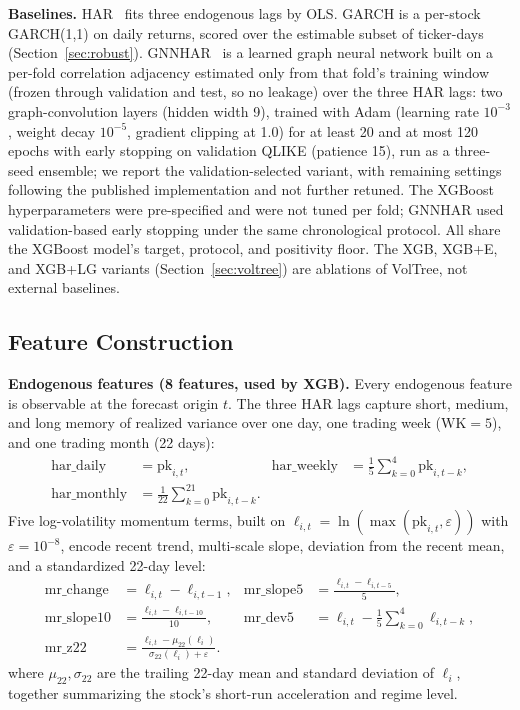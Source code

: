 \documentclass[runningheads,a4paper]{llncs}
\begin{document}
\textbf{Baselines.} HAR~\cite{corsi2009} fits three endogenous lags by OLS. GARCH is a per-stock
GARCH(1,1) on daily returns, scored over the estimable subset of ticker-days (Section~\ref{sec:robust}).
GNNHAR~\cite{gnnhar2024} is a learned graph neural network built on a per-fold correlation adjacency
estimated only from that fold's training window (frozen through validation and test, so no leakage) over the
three HAR lags: two graph-convolution layers (hidden width 9), trained with Adam (learning rate $10^{-3}$,
weight decay $10^{-5}$, gradient clipping at 1.0) for at least 20 and at most 120 epochs with early stopping
on validation QLIKE (patience 15), run as a three-seed ensemble; we report the validation-selected variant,
with remaining settings following the published implementation and not further retuned. The XGBoost
hyperparameters were pre-specified and were not tuned per fold; GNNHAR used validation-based early stopping
under the same chronological protocol. All
share the XGBoost model's target, protocol, and positivity floor. The XGB, XGB+E, and XGB+LG variants (Section~\ref{sec:voltree}) are ablations of VolTree, not
external baselines.

\subsection{Feature Construction}
\textbf{Endogenous features (8 features, used by XGB).} Every endogenous feature is observable at the
forecast origin $t$. The three HAR lags capture short, medium, and long memory of realized variance
over one day, one trading week ($\mathrm{WK}=5$), and one trading month (22 days):
\begin{align}
\mathrm{har\_daily} &= \mathrm{pk}_{i,t}, &
\mathrm{har\_weekly} &= \frac{1}{5}\sum_{k=0}^{4}\mathrm{pk}_{i,t-k},\\
\mathrm{har\_monthly} &= \frac{1}{22}\sum_{k=0}^{21}\mathrm{pk}_{i,t-k}. &&
\end{align}
Five log-volatility momentum terms, built on $\ell_{i,t}=\ln(\max(\mathrm{pk}_{i,t},\varepsilon))$ with
$\varepsilon=10^{-8}$, encode recent trend, multi-scale slope, deviation from the recent mean, and a
standardized 22-day level:
\begin{align}
\mathrm{mr\_change} &= \ell_{i,t}-\ell_{i,t-1}, &
\mathrm{mr\_slope5} &= \frac{\ell_{i,t}-\ell_{i,t-5}}{5},\\
\mathrm{mr\_slope10} &= \frac{\ell_{i,t}-\ell_{i,t-10}}{10}, &
\mathrm{mr\_dev5} &= \ell_{i,t}-\frac{1}{5}\sum_{k=0}^{4}\ell_{i,t-k},\\
\mathrm{mr\_z22} &= \frac{\ell_{i,t}-\mu_{22}(\ell_i)}{\sigma_{22}(\ell_i)+\varepsilon}. &&
\end{align}
where $\mu_{22},\sigma_{22}$ are the trailing 22-day mean and standard deviation of $\ell_i$, together
summarizing the stock's short-run acceleration and regime level.
\end{document}
